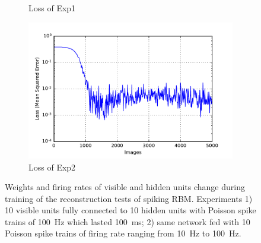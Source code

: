 \begin{figure}
\begin{subfigure}[t]{0.4\textwidth}
		\caption{Loss of Exp1}
	\end{subfigure}
	\begin{subfigure}[t]{0.4\textwidth}
		\includegraphics[width=\textwidth]{pics_sdlm/10_exp_SRBM_Orig/exp2_mse_nons.pdf}
		\caption{Loss of Exp2}
	\end{subfigure}
	\caption{Weights and firing rates of visible and hidden units change during training of the reconstruction tests of spiking RBM. 
		Experiments 1) 10 visible units fully connected to 10 hidden units with Poisson spike trains of 100~Hz which lasted 100~ms; 2) same network fed with 10 Poisson spike trains of firing rate ranging from 10~Hz to 100~Hz.}
\end{figure}

